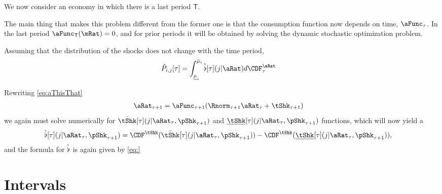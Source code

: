 \documentclass[\econtexRoot/BufferStockTheory.tex]{subfiles}
\begin{document}
\newcommand{\last}{\mathsf{T}}
We now consider an economy in which there is a last period $\last$.

The main thing that makes this problem different from the former one is that the consumption function now depends on time, $\aFunc_{\tAbs}$.  In the last period $\aFunc_{\last}(\mRat) = 0$, and for prior periods it will be obtained by solving the dynamic stochastic optimization problem.

Assuming that the distribution of the shocks does not change with the time period, 
\begin{align}
  \TnsMrkv_{\thisBin,\thatBin}[\tAbs] &= \int_{\Bot{\SetPartCnts}_{\thisBin}}^{\Top{\SetPartCnts}_{\thisBin}} \Nxt{\PrbBinNxtFmPntNow}[\tAbs](\thatBin|\pnt) d\CDF^{\pnt}_{\tAbs}
\end{align}

Rewriting \eqref{eq:aThisThat}
\begin{align}
  \pnt_{\tAbs+1} & = \aFunc_{\tAbs+1}(\Rnorm_{\tAbs+1} \pnt_{\tAbs} + \tShk_{\tAbs+1})
\end{align}
we again must solve numerically for $\Top{\tShk}[\tAbs](\thatBin|\pnt_{\tAbs},\pShk_{\tAbs+1})$ and $\Bot{\tShk}[\tAbs](\thatBin|\pnt_{\tAbs},\pShk_{\tAbs+1})$ functions, which will now yield a
\begin{align}
  \Nxt{\PrbBinNxtFmPntNow}[\tAbs](\thatBin|\pnt_{\tAbs},\pShk_{\tAbs+1}) & = \CDF^{\tShk}(\Top{\tShk}[\tAbs](\thatBin|\pnt_{\tAbs},\pShk_{\tAbs+1}))-\CDF^{\tShk}(\Bot{\tShk}[\tAbs](\thatBin|\pnt_{\tAbs},\pShk_{\tAbs+1})),
\end{align}
and the formula for $\grave{\flat}$ is again given by \eqref{eq:}

\begin{comment} %
  We now have the {pmf} of $\SetPartCnts_{\thatBin}$ for any fixed $\pnt_{\tAbs}$, so all we need to do is integrate over all possible values of $\pnt_{\tAbs} \in \SetPartCnts_{\thisBin}$:
  \begin{align}
    \TnsMrkv_{\thisBin,\thatBin}[\tAbs] &= \int_{\Bot{\SetPartCnts}_{\thisBin}}^{\Top{\SetPartCnts}_{\thisBin}} \Nxt{\PrbBinNxtFmPntNow}[\tAbs](\thatBin|\pnt_{\tAbs}) d\CDF^{\DnsShk}_{\tAbs}.
  \end{align}
\end{comment}


\section{Intervals}
\end{document}
